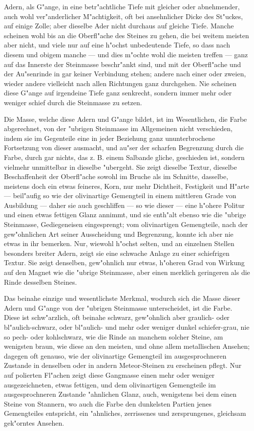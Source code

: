 \documentclass[a4paper, 11pt, oneside, german]{article}
\begin{document}
Adern, als G"ange, in eine betr"achtliche Tiefe mit gleicher oder abnehmender, auch wohl ver"anderlicher M"achtigkeit, oft bei ansehnlicher Dicke des St"uckes, auf einige Zolle; aber dieselbe Ader nicht durchaus auf gleiche Tiefe. Manche scheinen wohl bis an die Oberfl"ache des Steines zu gehen, die bei weitem meisten aber nicht, und viele nur auf eine h"ochst unbedeutende Tiefe, so dass nach diesem und obigem manche --- und dies m"ochte wohl die meisten treffen --- ganz auf das Innerste der Steinmasse beschr"ankt sind, und mit der Oberfl"ache und der Au"senrinde in gar keiner Verbindung stehen; andere nach einer oder zweien, wieder andere vielleicht nach allen Richtungen ganz durchgehen. Nie scheinen diese G"ange auf irgendeine Tiefe ganz senkrecht, sondern immer mehr oder weniger schief durch die Steinmasse zu setzen.

Die Masse, welche diese Adern und G"ange bildet, ist im Wesentlichen, die Farbe abgerechnet, von der "ubrigen Steinmasse im Allgemeinen nicht verschieden, indem sie im Gegenteile eine in jeder Beziehung ganz ununterbrochene Fortsetzung von dieser ausmacht, und au"ser der scharfen Begrenzung durch die Farbe, durch gar nichts, das z. B. einem Salbande gliche, geschieden ist, sondern vielmehr unmittelbar in dieselbe "ubergeht. Sie zeigt dieselbe Textur, dieselbe Beschaffenheit der Oberfl"ache sowohl im Bruche als im Schnitte, dasselbe, meistens doch ein etwas feineres, Korn, nur mehr Dichtheit, Festigkeit und H"arte --- beil"aufig so wie der olivinartige Gemengteil in einem mittleren Grade von Ausbildung --- daher sie auch geschliffen --- so wie dieser --- eine h"ohere Politur und einen etwas fettigen Glanz annimmt, und sie enth"alt ebenso wie die "ubrige Steinmasse, Gediegeneisen eingesprengt; vom olivinartigen Gemengteile, nach der gew"ohnlichen Art seiner Ausscheidung und Begrenzung, konnte ich aber nie etwas in ihr bemerken. Nur, wiewohl h"ochst selten, und an einzelnen Stellen besonders breiter Adern, zeigt sie eine schwache Anlage zu einer schiefrigen Textur. Sie zeigt denselben, gew"ohnlich nur etwas, h"oheren Grad von Wirkung auf den Magnet wie die "ubrige Steinmasse, aber einen merklich geringeren als die Rinde desselben Steines.

Das beinahe einzige und wesentlichste Merkmal, wodurch sich die Masse dieser Adern und G"ange von der "ubrigen Steinmasse unterscheidet, ist die Farbe. Diese ist schw"arzlich, oft beinahe schwarz, gew"ohnlich aber graulich- oder bl"aulich-schwarz, oder bl"aulich- und mehr oder weniger dunkel schiefer-grau, nie so pech- oder kohlschwarz, wie die Rinde an manchem solcher Steine, am wenigsten braun, wie diese an den meisten, und ohne allem metallischen Ansehen; dagegen oft genauso, wie der olivinartige Gemengteil im ausgesprochneren Zustande in denselben oder in andern Meteor-Steinen zu erscheinen pflegt. Nur auf polierten Fl"achen zeigt diese Gangmasse einen mehr oder weniger ausgezeichneten, etwas fettigen, und dem olivinartigen Gemengteile im ausgesprochneren Zustande "ahnlichen Glanz, auch, wenigstens bei dem einen Steine von Stannern, wo auch die Farbe den dunkelsten Partien jenes Gemengteiles entspricht, ein "ahnliches, zerrissenes und zersprungenes, gleichsam gek"orntes Ansehen.
\end{document}
